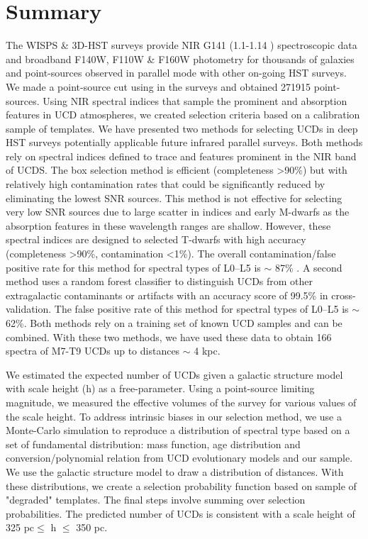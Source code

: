 \documentclass[manuscript]{aastex63}
\begin{document}
\section{Summary}
The WISPS \& 3D-HST surveys provide NIR G141 (1.1-1.14 \micron) spectroscopic data and broadband F140W, F110W \& F160W photometry for thousands of galaxies and point-sources observed in parallel mode with other on-going HST surveys. We made a point-source cut using in the surveys and obtained 271915 point-sources. Using NIR spectral indices that sample the prominent \wat and \meth absorption features in UCD atmospheres, we created selection criteria based on a calibration sample of templates. We have presented two methods for selecting UCDs in deep HST surveys potentially applicable future infrared parallel surveys. Both methods rely on spectral indices defined to trace \wat and \meth features prominent in the NIR band of UCDS. The box selection method is efficient (completeness \textgreater 90\%) but with relatively high contamination rates that could be significantly reduced by eliminating the lowest SNR sources. This method is not effective for selecting very low SNR sources due to large scatter in indices and early M-dwarfs as the absorption features in these wavelength ranges are shallow. However, these spectral indices are designed to selected T-dwarfs with high accuracy (completeness \textgreater 90\%, contamination \textless 1\%). The overall contamination/false positive rate for this method for spectral types of L0--L5 is $\sim$ 87\% . A second method uses a random forest classifier to distinguish UCDs from other extragalactic contaminants or artifacts with an accuracy score of 99.5\% in cross-validation. The false positive rate of this method  for spectral types of L0--L5 is $\sim$62\%. Both methods rely on a training set of known UCD samples and can be combined. With these two methods, we have used these data to obtain 166 spectra of M7-T9 UCDs up to distances $\sim$ 4 kpc. 

We estimated the expected number of UCDs given a galactic structure model with scale height (h) as a free-parameter. Using a point-source limiting magnitude, we measured the effective volumes of the survey for various values of the scale height. To address intrinsic biases in our selection method, we use a Monte-Carlo simulation to reproduce a distribution of spectral type based on a set of fundamental distribution: mass function, age distribution and conversion/polynomial relation from UCD evolutionary models and our sample. We use the galactic structure model to draw a distribution of distances. With these distributions, we create a selection probability function based on sample of "degraded" templates. The final steps involve summing over selection probabilities. The predicted number of UCDs is consistent with a scale height of 325 pc$\leq$ h $\leq$ 350 pc.  
\end{document}
